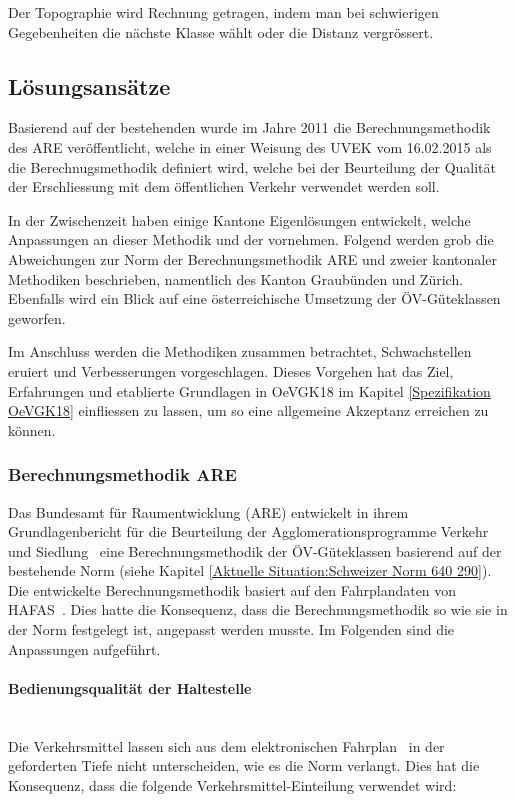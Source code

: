 Der Topographie wird Rechnung getragen, indem man bei schwierigen Gegebenheiten die nächste Klasse wählt oder die Distanz vergrössert.

\subsection{Lösungsansätze}
\label{Stand der Technik:Lösungsansätze}
Basierend auf der bestehenden  wurde im Jahre 2011 die Berechnungsmethodik des \ac{ARE} veröffentlicht, welche in einer Weisung des \acs{UVEK} vom 16.02.2015 als die Berechnugsmethodik definiert wird, welche bei der Beurteilung der Qualität der Erschliessung mit dem öffentlichen Verkehr verwendet werden soll.

In der Zwischenzeit haben einige Kantone Eigenlösungen entwickelt, welche Anpassungen an dieser Methodik und der  vornehmen.
Folgend werden grob die Abweichungen zur Norm der Berechnungsmethodik ARE und zweier kantonaler Methodiken beschrieben, namentlich des Kanton Graubünden und Zürich.
Ebenfalls wird ein Blick auf eine österreichische Umsetzung der \acs{ÖV}-Güteklassen geworfen.

Im Anschluss werden die Methodiken zusammen betrachtet, Schwachstellen eruiert und Verbesserungen vorgeschlagen.
Dieses Vorgehen hat das Ziel, Erfahrungen und etablierte Grundlagen in \gls{OeVGK18} im Kapitel \ref{Spezifikation OeVGK18} einfliessen zu lassen, um so eine allgemeine Akzeptanz erreichen zu können.

\subsubsection{Berechnungsmethodik ARE}
\label{Lösungsansätze:Berechnungsmethodik ARE}
Das Bundesamt für Raumentwicklung (ARE) entwickelt in ihrem Grundlagenbericht für die Beurteilung der Agglomerationsprogramme Verkehr und Siedlung~\cite{berechnung_are} eine Berechnungsmethodik der \acs{ÖV}-Güteklassen basierend auf der bestehende Norm (siehe Kapitel \ref{Aktuelle Situation:Schweizer Norm 640 290}).
Die entwickelte Berechnungsmethodik basiert auf den Fahrplandaten von HAFAS~\cite{sbb_hafas_spec}.
Dies hatte die Konsequenz, dass die Berechnungsmethodik so wie sie in der Norm festgelegt ist, angepasst werden musste.
Im Folgenden sind die Anpassungen aufgeführt.

\paragraph{Bedienungsqualität der Haltestelle}~\\
\label{Berechnungsmethodik ARE:Bedienungsqualität der Haltestelle}
Die Verkehrsmittel lassen sich aus dem elektronischen Fahrplan~\cite{sbb_hafas_spec} in der geforderten Tiefe nicht unterscheiden, wie es die Norm verlangt.
Dies hat die Konsequenz, dass die folgende Verkehrsmittel-Einteilung verwendet wird:


